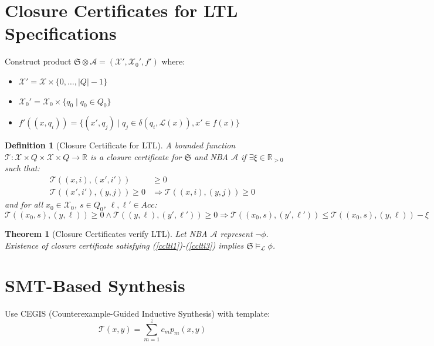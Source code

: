 \documentclass{article}
\newtheorem{definition}{Definition}
\newtheorem{theorem}{Theorem}
\begin{document}
\section{Closure Certificates for LTL Specifications}

Construct product $\mathfrak{S} \otimes \mathcal{A} = (\mathcal{X}', \mathcal{X}_0', f')$ where:
\begin{itemize}
    \item $\mathcal{X}' = \mathcal{X} \times \{0, \ldots, |Q|-1\}$
    \item $\mathcal{X}_0' = \mathcal{X}_0 \times \{q_0 \mid q_0 \in Q_0\}$
    \item $f'((x, q_i)) = \{(x', q_j) \mid q_j \in \delta(q_i, \mathcal{L}(x)), x' \in f(x)\}$
\end{itemize}

\begin{definition}[Closure Certificate for LTL]
A bounded function $\mathcal{T}: \mathcal{X} \times Q \times \mathcal{X} \times Q \rightarrow \mathbb{R}$ is a closure certificate for $\mathfrak{S}$ and NBA $\mathcal{A}$ if $\exists \xi \in \mathbb{R}_{>0}$ such that:
\begin{align}
\mathcal{T}((x, i), (x', i')) &\geq 0 \label{ccltl1}\\
\mathcal{T}((x', i'), (y, j)) \geq 0 &\Rightarrow \mathcal{T}((x, i), (y, j)) \geq 0 \label{ccltl2}
\end{align}
and for all $x_0 \in \mathcal{X}_0$, $s \in Q_0$, $\ell, \ell' \in Acc$:
\begin{equation}
\mathcal{T}((x_0, s), (y, \ell)) \geq 0 \land \mathcal{T}((y, \ell), (y', \ell')) \geq 0 \Rightarrow \mathcal{T}((x_0, s), (y', \ell')) \leq \mathcal{T}((x_0, s), (y, \ell)) - \xi \label{ccltl3}
\end{equation}
\end{definition}

\begin{theorem}[Closure Certificates verify LTL]
Let NBA $\mathcal{A}$ represent $\neg\phi$. Existence of closure certificate satisfying (\ref{ccltl1})-(\ref{ccltl3}) implies $\mathfrak{S} \models_{\mathcal{L}} \phi$.
\end{theorem}

\section{SMT-Based Synthesis}

Use CEGIS (Counterexample-Guided Inductive Synthesis) with template:
\begin{equation}
\mathcal{T}(x, y) = \sum_{m=1}^z c_m p_m(x, y)
\end{equation}
\end{document}
